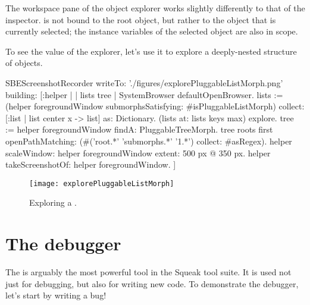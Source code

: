 \documentclass[a4paper,10pt,twoside]{book}
\begin{document}
The workspace pane of the object explorer works slightly differently to that of the inspector.
 is not bound to the root object, but rather to the object that is currently selected; the instance variables of the selected object are also in scope.

To see the value of the explorer, let's use it to explore a deeply-nested structure of objects.


\begin{ExecuteSmalltalkScript}
SBEScreenshotRecorder writeTo: './figures/explorePluggableListMorph.png' building: [:helper |
	| lists tree |
	SystemBrowser defaultOpenBrowser.
	lists := (helper foregroundWindow submorphsSatisfying: #isPluggableListMorph)
		collect: [:list | list center x -> list] as: Dictionary.
	(lists at: lists keys max) explore.
	tree := helper foregroundWindow findA: PluggableTreeMorph.
	tree roots first openPathMatching: (#('root.*' 'submorphs.*' '1.*') collect: #asRegex).
	helper scaleWindow: helper foregroundWindow extent: 500 px @ 350 px.
	helper takeScreenshotOf: helper foregroundWindow.
]
\end{ExecuteSmalltalkScript}
\begin{figure}[tbp]
	\begin{center}
		\texttt{[image: explorePluggableListMorph]}
	\end{center}
	\caption{Exploring a .}
	\label{fig:explorePluggableListMorph}
\end{figure}

\section{The debugger}
\label{sec:debugger} %

The  is arguably the most powerful tool in the Squeak tool suite.
It is used not just for debugging, but also for writing new code.
To demonstrate the debugger, let's start by writing a bug!
\end{document}
